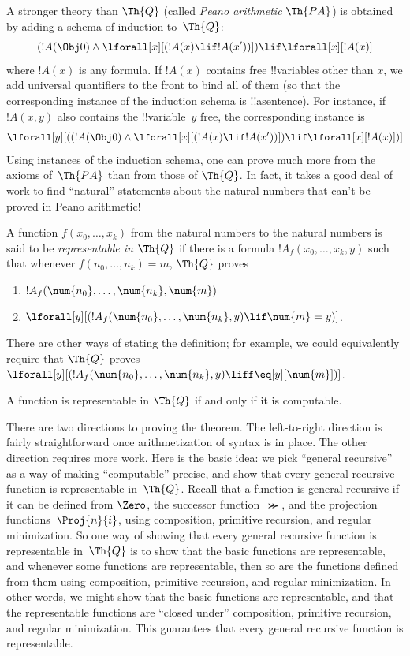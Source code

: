\documentclass[../../../include/open-logic-section]{subfiles}
\begin{document}
A stronger theory than $\Th{Q}$ (called \emph{Peano arithmetic} $\Th{PA}$)
is obtained by adding a schema of induction to~$\Th{Q}$:
\[
(!A(\Obj 0) \land \lforall[x][(!A(x) \lif !A(x'))]) \lif \lforall[x][!A(x)]
\]
where $!A(x)$ is any formula. If $!A(x)$ contains free !!{variable}s
other than $x$, we add universal quantifiers to the front to bind all
of them (so that the corresponding instance of the induction schema is
!!a{sentence}). For instance, if $!A(x, y)$ also contains the
!!{variable}~$y$ free, the corresponding instance is
\[
\lforall[y][((!A(\Obj 0) \land \lforall[x][(!A(x) \lif !A(x'))]) \lif
  \lforall[x][!A(x)])]
\]
Using instances of the induction schema, one can prove much more from
the axioms of~$\Th{PA}$ than from those of $\Th{Q}$. In fact, it takes
a good deal of work to find ``natural'' statements about the natural
numbers that can't be proved in Peano arithmetic!{}

\begin{defn}
  A function $f(x_0,\ldots,x_k)$ from the natural numbers to
  the natural numbers is said to be {\em representable in $\Th{Q}$} if
  there is a formula $!A_f(x_0,\dots,x_k,y)$ such that whenever
  $f(n_0,\dots,n_k) = m$, $\Th{Q}$ proves
\begin{enumerate}
\item{} $!A_f(\num{n_0}, \dots, \num{n_k}, \num{m})$
\item{} $\lforall[y][(!A_f(\num{n_0}, \dots,
\num{n_k}, y) \lif \num{m} = y)]$.
\end{enumerate}
\end{defn}

There are other ways of stating the definition; for example, we could
equivalently require that $\Th{Q}$ proves $\lforall[y][(!A_f(\num{n_0}, \dots,
\num{n_k}, y) \liff \eq[y][\num{m}])]$.

\begin{thm}
A function is representable in $\Th{Q}$ if and only if it is computable.
\end{thm}

There are two directions to proving the theorem. The left-to-right
direction is fairly straightforward once arithmetization of syntax is
in place. The other direction requires more work.  Here is the basic
idea: we pick ``general recursive'' as a way of making ``computable''
precise, and show that every general recursive function is
representable in~$\Th{Q}$. Recall that a function is general recursive
if it can be defined from $\Zero$, the successor function~$\Succ$, and the
projection functions~$\Proj{n}{i}$, using composition, primitive recursion,
and regular minimization. So one way of showing that every general
recursive function is representable in~$\Th{Q}$ is to show that the
basic functions are representable, and whenever some functions are
representable, then so are the functions defined from them using
composition, primitive recursion, and regular minimization. In other
words, we might show that the basic functions are representable, and
that the representable functions are ``closed under'' composition,
primitive recursion, and regular minimization.  This guarantees that
every general recursive function is representable.
\end{document}
